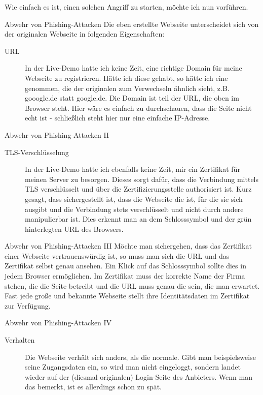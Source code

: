 \documentclass[hyperref={colorlinks,linkcolor=white}, utf8]{beamer}
\begin{document}
	\begin{frame}
		Wie einfach es ist, einen solchen Angriff zu starten, möchte ich nun vorführen.
	\end{frame}
	
	\begin{frame}{Abwehr von Phishing-Attacken}
		Die eben erstellte Webseite unterscheidet sich von der originalen Webseite in folgenden Eigenschaften:		
		\begin{description}
			\item[URL] {In der Live-Demo hatte ich keine Zeit, eine richtige Domain für meine Webseite zu registrieren. Hätte ich diese gehabt, so hätte ich eine genommen, die der originalen zum Verwechseln ähnlich sieht, z.B. gooogle.de statt google.de.
			Die Domain ist teil der URL, die oben im Browser steht.
			Hier wäre es einfach zu durchschauen, dass die Seite nicht echt ist - schließlich steht hier nur eine einfache IP-Adresse.}
		\end{description}
	\end{frame}

	\begin{frame}{Abwehr von Phishing-Attacken II}
		\begin{description}
			\item[TLS-Verschlüsselung] {In der Live-Demo hatte ich ebenfalls keine Zeit, mir ein Zertifikat für meinen Server zu besorgen. Dieses sorgt dafür, dass die Verbindung mittels TLS verschlüsselt und über die Zertifizierungsstelle authorisiert ist. Kurz gesagt, dass sichergestellt ist, dass die Webseite die ist, für die sie sich ausgibt und die Verbindung stets verschlüsselt und nicht durch andere manipulierbar ist. Dies erkennt man an dem Schlosssymbol und der grün hinterlegten URL des Browsers.}			
		\end{description}
	\end{frame}
	
	\begin{frame}{Abwehr von Phishing-Attacken III}
		Möchte man sichergehen, dass das Zertifikat einer Webseite vertrauenswürdig ist, so muss man sich die URL und das Zertifikat selbst genau ansehen. Ein Klick auf das Schlosssymbol sollte dies in jedem Browser ermöglichen.
		Im Zertifikat muss der korrekte Name der Firma stehen, die die Seite betreibt und die URL muss genau die sein, die man erwartet. Fast jede große und bekannte Webseite stellt ihre Identitätsdaten im Zertifikat zur Verfügung.
	\end{frame}
	
	\begin{frame}{Abwehr von Phishing-Attacken IV}
		\begin{description}
			\item[Verhalten] {Die Webseite verhält sich anders, als die normale. Gibt man beispielsweise seine Zugangsdaten ein, so wird man nicht eingeloggt, sondern landet wieder auf der (diesmal originalen) Login-Seite des Anbieters. Wenn man das bemerkt, ist es allerdings schon zu spät.}
		\end{description}
	\end{frame}
	
\end{document}
